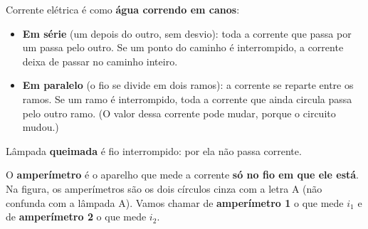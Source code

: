 \begin{enunciado}

\end{enunciado}


\begin{ideia}
Corrente elétrica é como \textbf{água correndo em canos}:
\begin{itemize}
  \item \textbf{Em série} (um depois do outro, sem desvio): toda a corrente que passa por um passa pelo outro.
        Se um ponto do caminho é interrompido, a corrente deixa de passar no caminho inteiro.
  \item \textbf{Em paralelo} (o fio se divide em dois ramos): a corrente se reparte entre os ramos. Se um ramo é interrompido,
        toda a corrente que ainda circula passa pelo outro ramo. (O valor dessa corrente pode mudar, porque o circuito mudou.)
\end{itemize}
Lâmpada \textbf{queimada} é fio interrompido: por ela não passa corrente.

O \textbf{amperímetro} é o aparelho que mede a corrente \textbf{só no fio em que ele está}. Na figura, os amperímetros são os
dois círculos cinza com a letra A (não confunda com a lâmpada A). Vamos chamar de \textbf{amperímetro 1} o que mede $i_1$ e de
\textbf{amperímetro 2} o que mede $i_2$.
\end{ideia}


